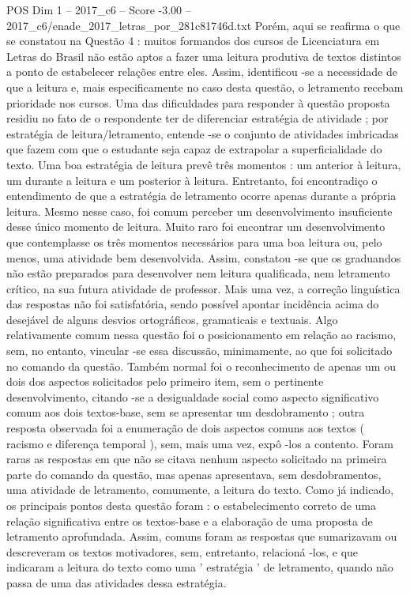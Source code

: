 \begin{textsample}{POS Dim 1 – 2017\_c6 – Score -3.00 – 2017\_c6/enade\_2017\_letras\_por\_281c81746d.txt}
Porém, aqui se reafirma o que se constatou na Questão 4 : muitos formandos dos cursos de Licenciatura em Letras do Brasil não estão aptos a fazer uma leitura produtiva de textos distintos a ponto de estabelecer relações entre eles.
Assim, identificou -se a necessidade de que a leitura e, mais especificamente no caso desta questão, o letramento recebam prioridade nos cursos.
Uma das dificuldades para responder à questão proposta residiu no fato de o respondente ter de diferenciar estratégia de atividade ; por estratégia de leitura/letramento, entende -se o conjunto de atividades imbricadas que fazem com que o estudante seja capaz de extrapolar a superficialidade do texto.
Uma boa estratégia de leitura prevê três momentos : um anterior à leitura, um durante a leitura e um posterior à leitura.
Entretanto, foi encontradiço o entendimento de que a estratégia de letramento ocorre apenas durante a própria leitura.
Mesmo nesse caso, foi comum perceber um desenvolvimento insuficiente desse único momento de leitura.
Muito raro foi encontrar um desenvolvimento que contemplasse os três momentos necessários para uma boa leitura ou, pelo menos, uma atividade bem desenvolvida.
Assim, constatou -se que os graduandos não estão preparados para desenvolver nem leitura qualificada, nem letramento crítico, na sua futura atividade de professor.
Mais uma vez, a correção linguística das respostas não foi satisfatória, sendo possível apontar incidência acima do desejável de alguns desvios ortográficos, gramaticais e textuais.
Algo relativamente comum nessa questão foi o posicionamento em relação ao racismo, sem, no entanto, vincular -se essa discussão, minimamente, ao que foi solicitado no comando da questão.
Também normal foi o reconhecimento de apenas um ou dois dos aspectos solicitados pelo primeiro item, sem o pertinente desenvolvimento, citando -se a desigualdade social como aspecto significativo comum aos dois textos-base, sem se apresentar um desdobramento ; outra resposta observada foi a enumeração de dois aspectos comuns aos textos ( racismo e diferença temporal ), sem, mais uma vez, expô -los a contento.
Foram raras as respostas em que não se citava nenhum aspecto solicitado na primeira parte do comando da questão, mas apenas apresentava, sem desdobramentos, uma atividade de letramento, comumente, a leitura do texto.
Como já indicado, os principais pontos desta questão foram : o estabelecimento correto de uma relação significativa entre os textos-base e a elaboração de uma proposta de letramento aprofundada.
Assim, comuns foram as respostas que sumarizavam ou descreveram os textos motivadores, sem, entretanto, relacioná -los, e que indicaram a leitura do texto como uma ' estratégia ' de letramento, quando não passa de uma das atividades dessa estratégia.

\end{textsample}
